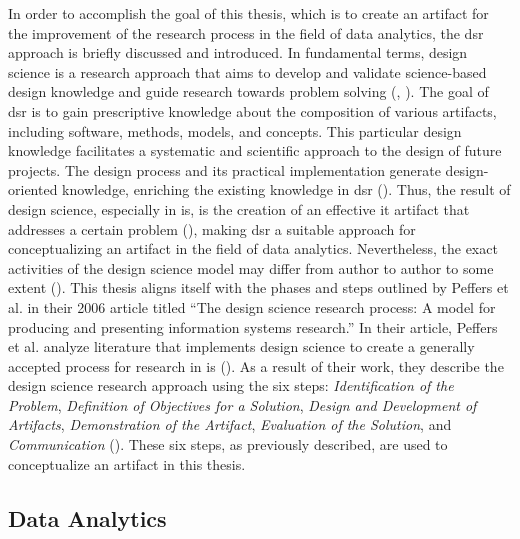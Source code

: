 In order to accomplish the goal of this thesis, which is to create an artifact for the improvement of the research process in the field of data analytics, the \ac{dsr} approach is briefly discussed and introduced. In fundamental terms, design science is a research approach that aims to develop and validate science-based design knowledge and guide research towards problem solving (\cite{Hevner.2004}, \cite{Dresch.2015}). The goal of \ac{dsr} is to gain prescriptive knowledge about the composition of various artifacts, including software, methods, models, and concepts. This particular design knowledge facilitates a systematic and scientific approach to the design of future projects. The design process and its practical implementation generate design-oriented knowledge, enriching the existing knowledge in \ac{dsr} (\cite{Hevner.2004}). Thus, the result of design science, especially in \ac{is}, is the creation of an effective \ac{it} artifact that addresses a certain problem (\cite{Hevner.2004}), making \ac{dsr} a suitable approach for conceptualizing an artifact in the field of data analytics. Nevertheless, the exact activities of the design science model may differ from author to author to some extent (\cite{Fulcher.1996}). This thesis aligns itself with the phases and steps outlined by Peffers et al. in their 2006 article titled \enquote{The design science research process: A model for producing and presenting information systems research.} In their article, Peffers et al. analyze literature that implements design science to create a generally accepted process for research in \ac{is} (\cite{Peffers.2006}). As a result of their work, they describe the design science research approach using the six steps: \textit{Identification of the Problem}, \textit{Definition of Objectives for a Solution}, \textit{Design and Development of Artifacts}, \textit{Demonstration of the Artifact}, \textit{Evaluation of the Solution}, and \textit{Communication} (\cite{Peffers.2006}). These six steps, as previously described, are used to conceptualize an artifact in this thesis.



\subsection{Data Analytics}

